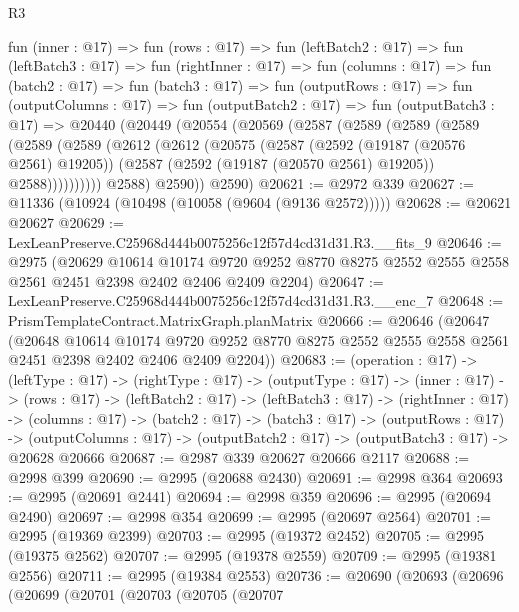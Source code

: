 \begin{lexlean}{R3}
\begin{coremodule}
  fun (inner : @17) =>
  fun (rows : @17) =>
  fun (leftBatch2 : @17) =>
  fun (leftBatch3 : @17) =>
  fun (rightInner : @17) =>
  fun (columns : @17) =>
  fun (batch2 : @17) =>
  fun (batch3 : @17) =>
  fun (outputRows : @17) =>
  fun (outputColumns : @17) =>
  fun (outputBatch2 : @17) =>
  fun (outputBatch3 : @17) =>
  @20440
    (@20449
      (@20554
        (@20569
          (@2587
            (@2589
              (@2589
                (@2589
                  (@2589
                    (@2589
                      (@2612
                        (@2612
                          (@20575
                            (@2587
                              (@2592 (@19187 (@20576 @2561) @19205))
                              (@2587 (@2592 (@19187 (@20570 @2561) @19205)) @2588))))))))))
            @2588)
          @2590))
      @2590)
@20621 := @2972 @339
@20627 := @11336 (@10924 (@10498 (@10058 (@9604 (@9136 @2572)))))
@20628 := @20621 @20627
@20629 := LexLeanPreserve.C25968d444b0075256c12f57d4cd31d31.R3.__fits_9
@20646 := @2975
    (@20629
      @10614
      @10174
      @9720
      @9252
      @8770
      @8275
      @2552
      @2555
      @2558
      @2561
      @2451
      @2398
      @2402
      @2406
      @2409
      @2204)
@20647 := LexLeanPreserve.C25968d444b0075256c12f57d4cd31d31.R3.__enc_7
@20648 := PrismTemplateContract.MatrixGraph.planMatrix
@20666 := @20646
    (@20647
      (@20648
        @10614
        @10174
        @9720
        @9252
        @8770
        @8275
        @2552
        @2555
        @2558
        @2561
        @2451
        @2398
        @2402
        @2406
        @2409
        @2204))
@20683 := (operation : @17) ->
  (leftType : @17) ->
  (rightType : @17) ->
  (outputType : @17) ->
  (inner : @17) ->
  (rows : @17) ->
  (leftBatch2 : @17) ->
  (leftBatch3 : @17) ->
  (rightInner : @17) ->
  (columns : @17) ->
  (batch2 : @17) ->
  (batch3 : @17) ->
  (outputRows : @17) ->
  (outputColumns : @17) -> (outputBatch2 : @17) -> (outputBatch3 : @17) -> @20628 @20666
@20687 := @2987 @339 @20627 @20666 @2117
@20688 := @2998 @399
@20690 := @2995 (@20688 @2430)
@20691 := @2998 @364
@20693 := @2995 (@20691 @2441)
@20694 := @2998 @359
@20696 := @2995 (@20694 @2490)
@20697 := @2998 @354
@20699 := @2995 (@20697 @2564)
@20701 := @2995 (@19369 @2399)
@20703 := @2995 (@19372 @2452)
@20705 := @2995 (@19375 @2562)
@20707 := @2995 (@19378 @2559)
@20709 := @2995 (@19381 @2556)
@20711 := @2995 (@19384 @2553)
@20736 := @20690
    (@20693
      (@20696
        (@20699
          (@20701
            (@20703
              (@20705
                (@20707

\end{coremodule}
\end{lexlean}
